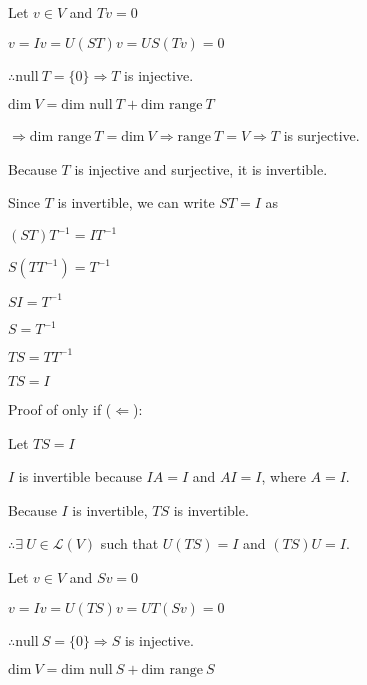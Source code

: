 \documentclass[fleqn]{article}
\begin{document}
\begin{enumerate}[nolistsep]
	Let $v \in V$ and $Tv = 0$
	
	$v = Iv = U(ST)v = US(Tv) = 0$
	
	$\therefore \text{null}\ T = \{0\} \Rightarrow T$ is injective.
	
	$\text{dim}\ V = \text{dim null}\ T + \text{dim range}\ T$
	
	$\Rightarrow \text{dim range}\ T = \text{dim}\ V \Rightarrow \text{range}\ T = V \Rightarrow T$ is surjective. 
	
	Because $T$ is injective and surjective, it is invertible.
	
	
	
	
	
	
	
	
	
	Since $T$ is invertible, we can write $ST = I$ as
	
	$(ST)T^{-1} = IT^{-1}$
	
	$S(TT^{-1}) = T^{-1}$
	
	$SI = T^{-1}$
	
	$S = T^{-1}$
	
	$TS = TT^{-1}$
	
	$TS = I$
	
	Proof of only if ($\Leftarrow$):
	
	Let $TS = I$
	
	$I$ is invertible because $IA = I$ and $AI = I$, where $A = I$.
	
	Because $I$ is invertible, $TS$ is invertible.
	
	$\therefore \exists\ U \in \mathcal{L}(V)$ such that $U(TS) = I$ and $(TS)U = I$.
	
	Let $v \in V$ and $Sv = 0$
	
	$v = Iv = U(TS)v = UT(Sv) = 0$
	
	$\therefore \text{null}\ S = \{0\} \Rightarrow S$ is injective.
	
	$\text{dim}\ V = \text{dim null}\ S + \text{dim range}\ S$
	

\end{enumerate}
\end{document}
